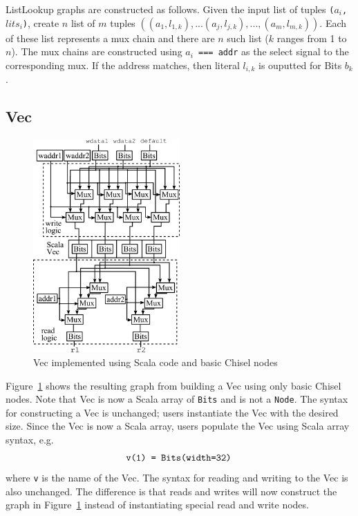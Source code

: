 ListLookup graphs are constructed as follows. Given the input list of
tuples {\tt ($a_i$, $lits_i$)}, create $n$ list of $m$ tuples
{\tt $( (a_1, l_{1, k}), ... (a_j, l_{j, k}), ..., (a_m, l_{m, k})
  )$}. Each of these list represents a mux chain and there are $n$
such list ($k$ ranges from 1 to $n$). The mux chains are constructed
using {\tt $a_i$ === addr} as the select signal to the corresponding
mux. If the address matches, then literal {\tt $l_{i, k}$} is ouputted
for Bits $b_k$.

\subsection{Vec}
\begin{figure}[htb]
\centering
\includegraphics[width=0.5\textwidth]{figures/vecscala.pdf}
\caption{Vec implemented using Scala code and basic Chisel nodes}
\label{fig:vecscala}
\end{figure}

Figure~\ref{fig:vecscala} shows the resulting graph from building a
Vec using only basic Chisel nodes. Note that Vec is now a Scala array
of {\tt Bits} and is not a {\tt Node}. The syntax for constructing a
Vec is unchanged; users instantiate the Vec with the desired
size. Since the Vec is now a Scala array, users populate the Vec using
Scala array syntax, e.g.
\begin{align*}
  \text{ \tt{v(1) = Bits(width=32)} }
\end{align*}
where {\tt v} is the name of the Vec. The syntax for reading and
writing to the Vec is also unchanged. The difference is that reads
and writes will now construct the graph in Figure~\ref{fig:vecscala}
instead of instantiating special read and write nodes.

